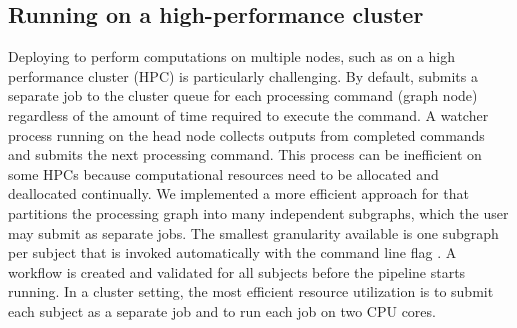 \subsection{Running on a high-performance cluster}\label{sec:runningonhpc}

Deploying  to perform computations on multiple nodes, such as on a high performance cluster (HPC) is particularly challenging. By default,  submits a separate job to the cluster queue for each processing command (graph node) regardless of the amount of time required to execute the command. A watcher process running on the head node collects outputs from completed commands and submits the next processing command. This process can be inefficient on some HPCs because computational resources need to be allocated and deallocated continually. We implemented a more efficient approach for  that partitions the processing graph into many independent subgraphs, which the user may submit as separate jobs. The smallest granularity available is one subgraph per subject that is invoked automatically with the command line flag . A  workflow is created and validated for all subjects before the pipeline starts running. In a cluster setting, the most efficient resource utilization is to submit each subject as a separate job and to run each job on two CPU cores.
